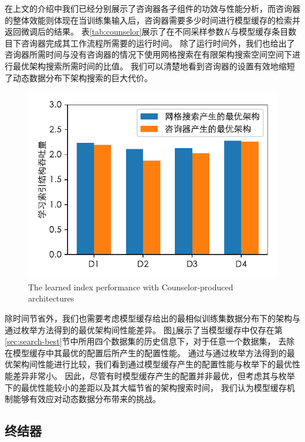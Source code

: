 在上文的介绍中我们已经分别展示了咨询器各子组件的功效与性能分析，而咨询器的整体效能则体现在当训练集输入后，咨询器需要多少时间进行模型缓存的检索并返回微调后的结果。
表\ref{tab:counselor}展示了在不同采样参数$K$与模型缓存条目数目下咨询器完成其工作流程所需要的运行时间。
除了运行时间外，我们也给出了咨询器所需时间与没有咨询器的情况下使用网格搜索在有限架构搜索空间空间下进行最优架构搜索所需时间的比值。
我们可以清楚地看到咨询器的设置有效地缩短了动态数据分布下架构搜索的巨大代价。

\begin{figure}[!htp]
  \centering
  \includegraphics{figure/counselor.pdf}
    {The learned index performance with Counselor-produced architectures}
  \label{fig::counselor}
\end{figure}

除时间节省外，我们也需要考虑模型缓存给出的最相似训练集数据分布下的{\rmi}架构与通过枚举方法得到的最优{\rmi}架构间性能差异。
图\ref{fig::counselor}展示了当模型缓存中仅存在第\ref{sec:search-best}节中所用四个数据集的历史信息下，对于任意一个数据集，
去除在模型缓存中其最优的{\rmi}配置后所产生的配置性能。
通过与通过枚举方法得到的最优{\rmi}架构间性能进行比较，我们看到通过模型缓存产生的{\rmi}配置性能与枚举下的最优性能差异非常小。
因此，尽管有时模型缓存产生的{\rmi}配置并非最优，但考虑其与枚举下的最优性能较小的差距以及其大幅节省的架构搜索时间，
我们认为模型缓存机制能够有效应对动态数据分布带来的挑战。

\subsection{终结器}


